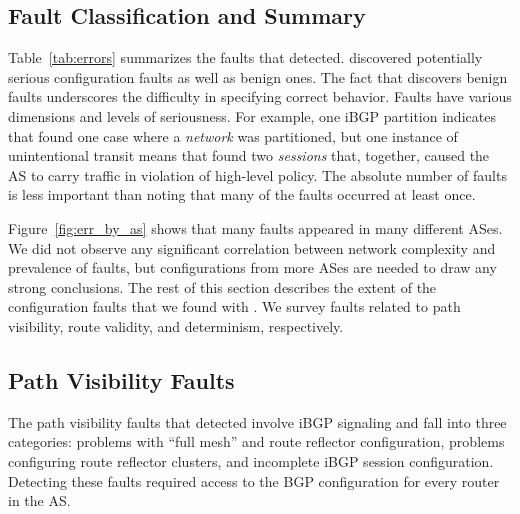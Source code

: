\subsection{Fault Classification and Summary}

Table~\ref{tab:errors} summarizes the faults that \rcc detected.
\rcc discovered potentially serious configuration faults as
well as benign ones.  The fact that \rcc discovers benign faults
underscores the difficulty in specifying correct behavior.  
Faults
have various dimensions and levels of seriousness.  For example, one
iBGP partition indicates that \rcc found 
one case where a {\em network} was partitioned, but one instance of
unintentional transit means that \rcc found two {\em sessions} that,
together, caused the AS
to carry traffic in violation of high-level policy.
The absolute number
of faults is less important than noting that many of the faults occurred
at least once.  

Figure~\ref{fig:err_by_as} shows that many faults appeared in many
different ASes.  
We did not observe any significant correlation between
network complexity and prevalence of faults, but configurations from
more ASes are needed to draw any strong conclusions.  The rest of this
section describes the extent of the configuration faults that we found
with \rccns.  We survey faults related to path visibility, route
validity, and determinism, respectively.





\subsection{Path Visibility Faults}

The path visibility faults that \rcc detected involve iBGP signaling and
fall into three categories: 
problems with ``full mesh'' and route reflector configuration, problems
configuring route reflector clusters, and incomplete iBGP session
configuration.  Detecting these faults required access to
the BGP configuration for every router in the AS.  



